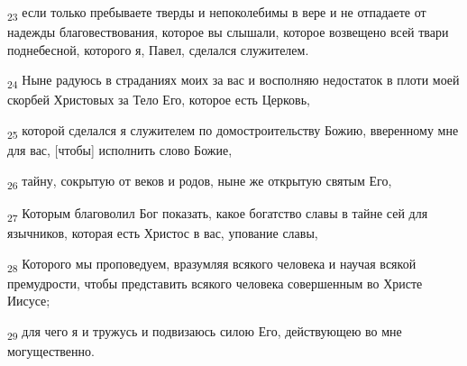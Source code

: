 \begin{tcolorbox}
\textsubscript{23} если только пребываете тверды и непоколебимы в вере и не отпадаете от надежды благовествования, которое вы слышали, которое возвещено всей твари поднебесной, которого я, Павел, сделался служителем.
\end{tcolorbox}
\begin{tcolorbox}
\textsubscript{24} Ныне радуюсь в страданиях моих за вас и восполняю недостаток в плоти моей скорбей Христовых за Тело Его, которое есть Церковь,
\end{tcolorbox}
\begin{tcolorbox}
\textsubscript{25} которой сделался я служителем по домостроительству Божию, вверенному мне для вас, [чтобы] исполнить слово Божие,
\end{tcolorbox}
\begin{tcolorbox}
\textsubscript{26} тайну, сокрытую от веков и родов, ныне же открытую святым Его,
\end{tcolorbox}
\begin{tcolorbox}
\textsubscript{27} Которым благоволил Бог показать, какое богатство славы в тайне сей для язычников, которая есть Христос в вас, упование славы,
\end{tcolorbox}
\begin{tcolorbox}
\textsubscript{28} Которого мы проповедуем, вразумляя всякого человека и научая всякой премудрости, чтобы представить всякого человека совершенным во Христе Иисусе;
\end{tcolorbox}
\begin{tcolorbox}
\textsubscript{29} для чего я и тружусь и подвизаюсь силою Его, действующею во мне могущественно.
\end{tcolorbox}
